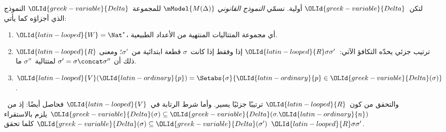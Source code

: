 \documentclass[../../../include/open-logic-section]{subfiles}
\begin{document}
\begin{defn}
  لتكن~$\OLId{greek-variable}{Delta}$ أولية. نسمّي \emph{النموذج القانوني}
  $\mModel{M(\Delta)}$ للمجموعة~$\OLId{greek-variable}{Delta}$ النموذج الذي أجزاؤه كما يأتي:
  \begin{enumerate}
  \item $\OLId{latin-looped}{W} = \Nat^*$، أي مجموعة المتتاليات المنتهية من الأعداد الطبيعية.
  \item $\OLId{latin-looped}{R}$ ترتيب جزئي يحدّه التكافؤ الآتي:~$\OLId{latin-looped}{R}\sigma\sigma'$ إذا وفقط إذا
    كانت~$\sigma$ قطعة ابتدائية من~$\sigma'$؛ ومعنى ذلك أن
    $\sigma'=\sigma\concat\sigma''$ لمتتالية~$\sigma''$ ما.
  \item $\OLId{latin-looped}{V}(\OLId{latin-ordinary}{p}) = \Setabs{\sigma}{\OLId{latin-ordinary}{p} \in \OLId{greek-variable}{Delta}(\sigma)}$.
  \end{enumerate}
\end{defn}

والتحقق من كون~$\OLId{latin-looped}{R}$ ترتيبًا جزئيًا يسير. وأما شرط الرتابة في~$\OLId{latin-looped}{V}$
فحاصل أيضًا: إذ من~$\OLId{greek-variable}{Delta}(\sigma)\subseteq\OLId{greek-variable}{Delta}(\sigma.\OLId{latin-ordinary}{n})$ يلزم بالاستقراء
$\OLId{greek-variable}{Delta}(\sigma)\subseteq\OLId{greek-variable}{Delta}(\sigma')$ كلما تحقق
$\OLId{latin-looped}{R}\sigma\sigma'$.
\end{document}
